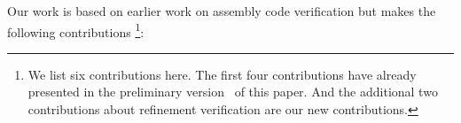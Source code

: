 
Our work is based on earlier work on assembly code
verification but makes the following contributions
\footnote{We list six contributions here. The 
first four contributions have already presented 
in the preliminary version~\cite{zha18aplas} 
of this paper. And the 
additional two contributions about refinement 
verification are our new contributions.}:



